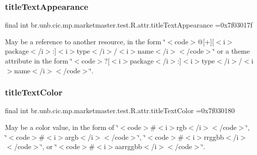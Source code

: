 \subsubsection{\texorpdfstring{title\+Text\+Appearance}{titleTextAppearance}}
{\footnotesize\ttfamily final int br.\+unb.\+cic.\+mp.\+marketmaster.\+test.\+R.\+attr.\+title\+Text\+Appearance =0x7f03017f\hspace{0.3cm}{\ttfamily [static]}}

May be a reference to another resource, in the form \char`\"{}$<$code$>$@\mbox{[}+\mbox{]}\mbox{[}$<$i$>$package$<$/i$>$\+:\mbox{]}$<$i$>$type$<$/i$>$/$<$i$>$name$<$/i$>$$<$/code$>$\char`\"{} or a theme attribute in the form \char`\"{}$<$code$>$?\mbox{[}$<$i$>$package$<$/i$>$\+:\mbox{]}$<$i$>$type$<$/i$>$/$<$i$>$name$<$/i$>$$<$/code$>$\char`\"{}. \mbox{\label{classbr_1_1unb_1_1cic_1_1mp_1_1marketmaster_1_1test_1_1R_1_1attr_a471935e8af530e9cc3caa19d5b930ed8}} 
\subsubsection{\texorpdfstring{title\+Text\+Color}{titleTextColor}}
{\footnotesize\ttfamily final int br.\+unb.\+cic.\+mp.\+marketmaster.\+test.\+R.\+attr.\+title\+Text\+Color =0x7f030180\hspace{0.3cm}{\ttfamily [static]}}

May be a color value, in the form of \char`\"{}$<$code$>$\#$<$i$>$rgb$<$/i$>$$<$/code$>$\char`\"{}, \char`\"{}$<$code$>$\#$<$i$>$argb$<$/i$>$$<$/code$>$\char`\"{}, \char`\"{}$<$code$>$\#$<$i$>$rrggbb$<$/i$>$$<$/code$>$\char`\"{}, or \char`\"{}$<$code$>$\#$<$i$>$aarrggbb$<$/i$>$$<$/code$>$\char`\"{}. \mbox{\label{classbr_1_1unb_1_1cic_1_1mp_1_1marketmaster_1_1test_1_1R_1_1attr_a9abcca0c065d63f5268b82e537072a6d}} 
